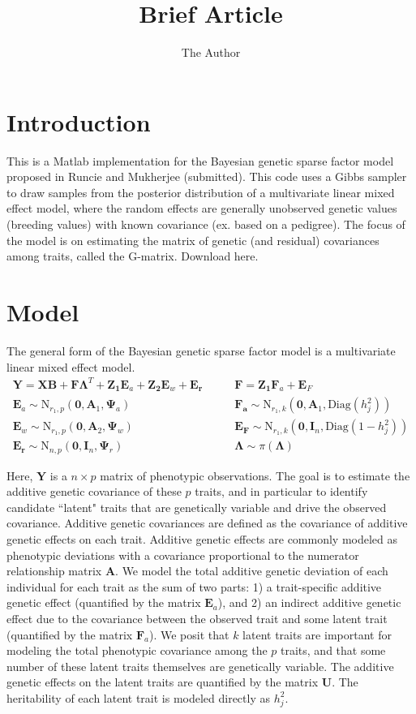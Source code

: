 \documentclass[11pt]{amsart}
\title{Brief Article}
\author{The Author}
\begin{document}
\section{Introduction}
This is a Matlab implementation for the Bayesian genetic sparse factor model proposed in Runcie and Mukherjee (submitted). This code uses a Gibbs sampler to draw samples from the posterior distribution of a multivariate linear mixed effect model, where the random effects are generally unobserved genetic values (breeding values) with known covariance (ex. based on a pedigree). The focus of the model is on estimating the matrix of genetic (and residual) covariances among traits, called the G-matrix. Download here.

\section{Model}
The general form of the Bayesian genetic sparse factor model is a multivariate linear mixed effect model.
\begin{align*}
\mathbf{Y} = \mathbf{X}\mathbf{B} + \mathbf{F}\mathbf{\Lambda}^T + \mathbf{Z_1}\mathbf{E}_a + \mathbf{Z_2}\mathbf{E}_w + \mathbf{E_r} \quad & \quad \mathbf{F} = \mathbf{Z_1}\mathbf{F}_a + \mathbf{E}_F \\
\mathbf{E}_a \sim \mbox{N}_{r_1,p}(\mathbf{0},\mathbf{A}_1,\mathbf{\Psi}_a)  \quad&\quad \mathbf{F_a} \sim \mbox{N}_{r_1,k}(\mathbf{0},\mathbf{A}_1,\mbox{Diag}(h^2_j)) \\
\mathbf{E}_w \sim \mbox{N}_{r_1,p}(\mathbf{0},\mathbf{A}_2,\mathbf{\Psi}_w)\quad&\quad   \mathbf{E_F} \sim \mbox{N}_{r_1,k}(\mathbf{0},\mathbf{I}_n,\mbox{Diag}(1-h^2_j)) \\
\mathbf{E_r} \sim \mbox{N}_{n,p}(\mathbf{0},\mathbf{I}_n,\mathbf{\Psi}_r) \quad&\quad \mathbf{\Lambda} \sim \pi(\mathbf{\Lambda})  
\end{align*}

Here, $\mathbf{Y}$ is a $n \times p$ matrix of phenotypic observations. The goal is to estimate the additive genetic covariance of these $p$ traits, and in particular to identify candidate ``latent" traits that are genetically variable and drive the observed covariance. Additive genetic covariances are defined as the covariance of additive genetic effects on each trait. Additive genetic effects are commonly modeled as phenotypic deviations with a covariance proportional to the numerator relationship matrix $\mathbf{A}$. We model the total additive genetic deviation of each individual for each trait as the sum of two parts: 1) a trait-specific additive genetic effect (quantified by the matrix $\mathbf{E}_a$), and 2) an indirect additive genetic effect due to the covariance between the observed trait and some latent trait (quantified by the matrix $\mathbf{F}_a$). We posit that $k$ latent traits are important for modeling the total phenotypic covariance among the $p$ traits, and that some number of these latent traits themselves are genetically variable. The additive genetic effects on the latent traits are quantified by the matrix $\mathbf{U}$. The heritability of each latent trait is modeled directly as $h^2_j$.
\end{document}
